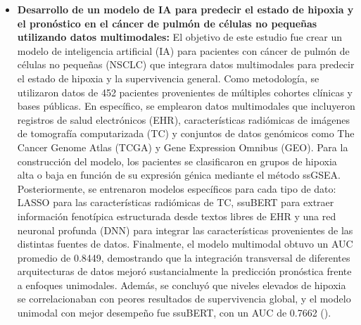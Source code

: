 \begin{itemize}
\item \textbf{Desarrollo de un modelo de IA para predecir el estado de hipoxia y el pronóstico en el cáncer de pulmón de células no pequeñas utilizando datos multimodales:} El objetivo de este estudio fue crear un modelo de inteligencia artificial (IA) para pacientes con cáncer de pulmón de células no pequeñas (NSCLC) que integrara datos multimodales para predecir el estado de hipoxia y la supervivencia general. Como metodología, se utilizaron datos de 452 pacientes provenientes de múltiples cohortes clínicas y bases públicas. En específico, se emplearon datos multimodales que incluyeron registros de salud electrónicos (EHR), características radiómicas de imágenes de tomografía computarizada (TC) y conjuntos de datos genómicos como The Cancer Genome Atlas (TCGA) y Gene Expression Omnibus (GEO). Para la construcción del modelo, los pacientes se clasificaron en grupos de hipoxia alta o baja en función de su expresión génica mediante el método ssGSEA. Posteriormente, se entrenaron modelos específicos para cada tipo de dato: LASSO para las características radiómicas de TC, ssuBERT para extraer información fenotípica estructurada desde textos libres de EHR y una red neuronal profunda (DNN) para integrar las características provenientes de las distintas fuentes de datos. Finalmente, el modelo multimodal obtuvo un AUC promedio de 0.8449, demostrando que la integración transversal de diferentes arquitecturas de datos mejoró sustancialmente la predicción pronóstica frente a enfoques unimodales. Además, se concluyó que niveles elevados de hipoxia se correlacionaban con peores resultados de supervivencia global, y el modelo unimodal con mejor desempeño fue ssuBERT, con un AUC de 0.7662 (\cite{article2}).

\end{itemize}
